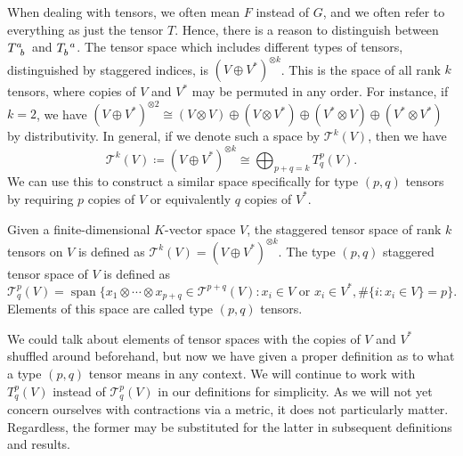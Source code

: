 \documentclass[a4paper,12pt]{article}
\begin{document}
When dealing with tensors, we often mean $F$ instead of $G$, and we often refer to everything as just the tensor $T$.
Hence, there is a reason to distinguish between $\tensor{T}{^a_b}$ and $\tensor{T}{_b^a}$.
The tensor space which includes different types of tensors, distinguished by staggered indices, is $(V \oplus V^*)^{\otimes k}$.
This is the space of all rank $k$ tensors, where copies of $V$ and $V^*$ may be permuted in any order.
For instance, if $k = 2$, we have $(V \oplus V^*)^{\otimes 2} \cong (V \otimes V) \oplus (V \otimes V^*) \oplus (V^* \otimes V) \oplus (V^* \otimes V^*)$ by distributivity.
In general, if we denote such a space by $\mathcal{T}^k(V)$, then we have
\begin{equation}
    \mathcal{T}^k(V) \coloneq (V \oplus V^*)^{\otimes k} \cong \bigoplus_{p+q=k} T^p_q(V).
\end{equation}
We can use this to construct a similar space specifically for type $(p, q)$ tensors by requiring $p$ copies of $V$ or equivalently $q$ copies of $V^*$.
\begin{definition}\label{def:staggered_tensor_space}
    Given a finite-dimensional $K$-vector space $V$, the staggered tensor space of rank $k$ tensors on $V$ is defined as $\mathcal{T}^k(V) = (V \oplus V^*)^{\otimes k}$.
    The type $(p, q)$ staggered tensor space of $V$ is defined as
    \begin{equation}
        \mathcal{T}^p_q(V) = \operatorname{span}\{x_1 \otimes \cdots \otimes x_{p+q} \in \mathcal{T}^{p+q}(V) : x_i \in V \text{ or } x_i \in V^*, \#\{i : x_i \in V \} = p\}.
    \end{equation}
    Elements of this space are called type $(p, q)$ tensors.
\end{definition}
We could talk about elements of tensor spaces with the copies of $V$ and $V^*$ shuffled around beforehand, but now we have given a proper definition as to what a type $(p, q)$ tensor means in any context.
We will continue to work with $T^p_q(V)$ instead of $\mathcal{T}^p_q(V)$ in our definitions for simplicity.
As we will not yet concern ourselves with contractions via a metric, it does not particularly matter.
Regardless, the former may be substituted for the latter in subsequent definitions and results.
\end{document}
